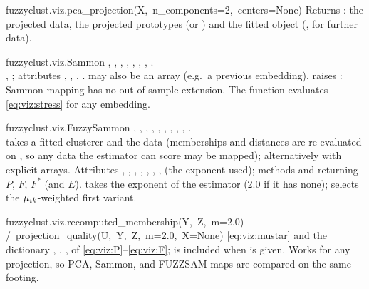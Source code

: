 \begin{apibox}{fuzzyclust.viz.pca\_projection(\allowbreak X,\allowbreak\ n\_components=2,\allowbreak\ centers=None)}
Returns : the projected data, the projected prototypes (or ) and the fitted  object (,  for further data).
\end{apibox}

\begin{apibox}{fuzzyclust.viz.Sammon}
, , , , , , , . \\
, ; attributes , , , .  may also be an array (e.g.\ a previous embedding).  raises : Sammon mapping has no out-of-sample extension. The function  evaluates \eqref{eq:viz:stress} for any embedding.
\end{apibox}

\begin{apibox}{fuzzyclust.viz.FuzzySammon}
, , , , , , , , , . \\
 takes a fitted clusterer and the data (memberships and distances are re-evaluated on , so any data the estimator can score may be mapped); alternatively  with explicit arrays. Attributes , , , , , , ,  (the exponent used); methods  and  returning $P$, $F$, $F^*$ (and $E$).  takes the exponent of the estimator (2.0 if it has none);  selects the $\mu_{ik}$-weighted first variant.
\end{apibox}

\begin{apibox}{fuzzyclust.viz.recomputed\_membership(\allowbreak Y,\allowbreak\ Z,\allowbreak\ m=2.0) /\allowbreak\ projection\_quality(\allowbreak U,\allowbreak\ Y,\allowbreak\ Z,\allowbreak\ m=2.0,\allowbreak\ X=None)}
\eqref{eq:viz:mustar} and the dictionary , , ,  of \eqref{eq:viz:P}--\eqref{eq:viz:F};  is included when  is given. Works for any projection, so PCA, Sammon, and FUZZSAM maps are compared on the same footing.
\end{apibox}

